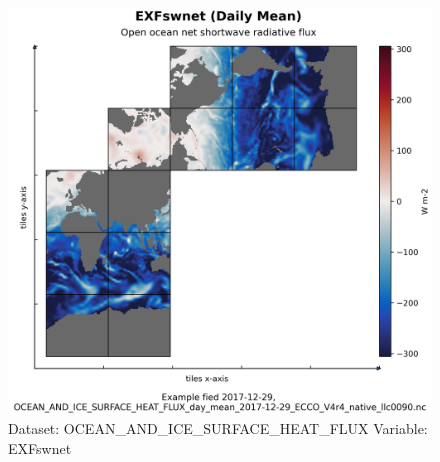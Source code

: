 \begin{figure}[H]
\centering
\includegraphics[width=\textwidth]{../images/plots/native_plots/Ocean_and_Sea-Ice_Surface_Heat_Fluxes/EXFswnet.png}
\caption{Dataset: OCEAN\_AND\_ICE\_SURFACE\_HEAT\_FLUX Variable: EXFswnet}
\label{tab:table-OCEAN_AND_ICE_SURFACE_HEAT_FLUX_EXFswnet-Plot}
\end{figure}
\pagebreak

